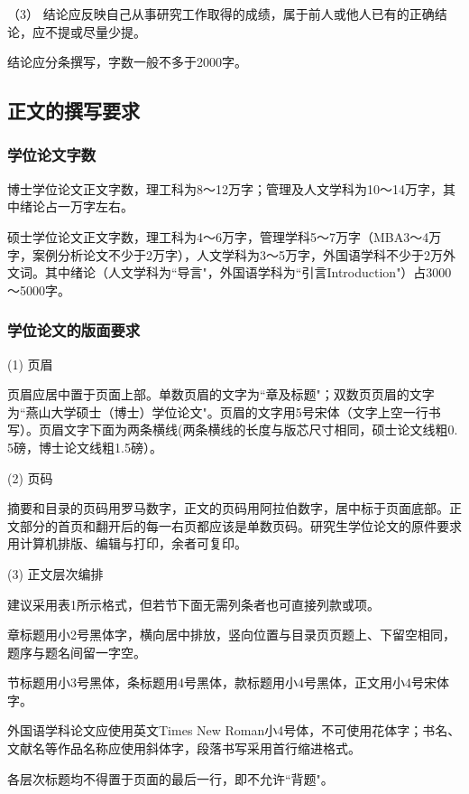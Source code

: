 （3）	结论应反映自己从事研究工作取得的成绩，属于前人或他人已有的正确结论，应不提或尽量少提。

结论应分条撰写，字数一般不多于2000字。


\subsection{正文的撰写要求}\label{appendixA-6-2}

\subsubsection{学位论文字数}\label{appendixA-6-2-1}
博士学位论文正文字数，理工科为8～12万字；管理及人文学科为10～14万字，其中绪论占一万字左右。

硕士学位论文正文字数，理工科为4～6万字，管理学科5～7万字（MBA3～4万字，案例分析论文不少于2万字），人文学科为3～5万字，外国语学科不少于2万外文词。其中绪论（人文学科为``导言"，外国语学科为``引言Introduction"）占3000～5000字。

\subsubsection{学位论文的版面要求}\label{appendixA-6-2-2}

(1) 页眉

页眉应居中置于页面上部。单数页眉的文字为``章及标题"；双数页页眉的文字为``燕山大学硕士（博士）学位论文"。页眉的文字用5号宋体（文字上空一行书写）。页眉文字下面为两条横线(两条横线的长度与版芯尺寸相同，硕士论文线粗0. 5磅，博士论文线粗1.5磅）。

(2) 页码

摘要和目录的页码用罗马数字，正文的页码用阿拉伯数字，居中标于页面底部。正文部分的首页和翻开后的每一右页都应该是单数页码。研究生学位论文的原件要求用计算机排版、编辑与打印，余者可复印。

(3) 正文层次编排

建议采用表1所示格式，但若节下面无需列条者也可直接列款或项。

章标题用小2号黑体字，横向居中排放，竖向位置与目录页页题上、下留空相同，题序与题名间留一字空。

节标题用小3号黑体，条标题用4号黑体，款标题用小4号黑体，正文用小4号宋体字。

外国语学科论文应使用英文Times New Roman小4号体，不可使用花体字；书名、文献名等作品名称应使用斜体字，段落书写采用首行缩进格式。

各层次标题均不得置于页面的最后一行，即不允许``背题"。

